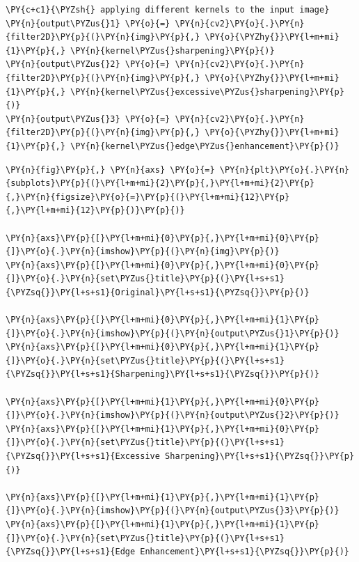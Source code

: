 \begin{tcolorbox}[breakable, size=fbox, boxrule=1pt, pad at break*=1mm,colback=cellbackground, colframe=cellborder]
	\begin{Verbatim}[commandchars=\\\{\}]
\PY{c+c1}{\PYZsh{} applying different kernels to the input image}
\PY{n}{output\PYZus{}1} \PY{o}{=} \PY{n}{cv2}\PY{o}{.}\PY{n}{filter2D}\PY{p}{(}\PY{n}{img}\PY{p}{,} \PY{o}{\PYZhy{}}\PY{l+m+mi}{1}\PY{p}{,} \PY{n}{kernel\PYZus{}sharpening}\PY{p}{)}
\PY{n}{output\PYZus{}2} \PY{o}{=} \PY{n}{cv2}\PY{o}{.}\PY{n}{filter2D}\PY{p}{(}\PY{n}{img}\PY{p}{,} \PY{o}{\PYZhy{}}\PY{l+m+mi}{1}\PY{p}{,} \PY{n}{kernel\PYZus{}excessive\PYZus{}sharpening}\PY{p}{)}
\PY{n}{output\PYZus{}3} \PY{o}{=} \PY{n}{cv2}\PY{o}{.}\PY{n}{filter2D}\PY{p}{(}\PY{n}{img}\PY{p}{,} \PY{o}{\PYZhy{}}\PY{l+m+mi}{1}\PY{p}{,} \PY{n}{kernel\PYZus{}edge\PYZus{}enhancement}\PY{p}{)}
	\end{Verbatim}
\end{tcolorbox}

\begin{tcolorbox}[breakable, size=fbox, boxrule=1pt, pad at break*=1mm,colback=cellbackground, colframe=cellborder]
	\begin{Verbatim}[commandchars=\\\{\}]
\PY{n}{fig}\PY{p}{,} \PY{n}{axs} \PY{o}{=} \PY{n}{plt}\PY{o}{.}\PY{n}{subplots}\PY{p}{(}\PY{l+m+mi}{2}\PY{p}{,}\PY{l+m+mi}{2}\PY{p}{,}\PY{n}{figsize}\PY{o}{=}\PY{p}{(}\PY{l+m+mi}{12}\PY{p}{,}\PY{l+m+mi}{12}\PY{p}{)}\PY{p}{)}

\PY{n}{axs}\PY{p}{[}\PY{l+m+mi}{0}\PY{p}{,}\PY{l+m+mi}{0}\PY{p}{]}\PY{o}{.}\PY{n}{imshow}\PY{p}{(}\PY{n}{img}\PY{p}{)}
\PY{n}{axs}\PY{p}{[}\PY{l+m+mi}{0}\PY{p}{,}\PY{l+m+mi}{0}\PY{p}{]}\PY{o}{.}\PY{n}{set\PYZus{}title}\PY{p}{(}\PY{l+s+s1}{\PYZsq{}}\PY{l+s+s1}{Original}\PY{l+s+s1}{\PYZsq{}}\PY{p}{)}

\PY{n}{axs}\PY{p}{[}\PY{l+m+mi}{0}\PY{p}{,}\PY{l+m+mi}{1}\PY{p}{]}\PY{o}{.}\PY{n}{imshow}\PY{p}{(}\PY{n}{output\PYZus{}1}\PY{p}{)}
\PY{n}{axs}\PY{p}{[}\PY{l+m+mi}{0}\PY{p}{,}\PY{l+m+mi}{1}\PY{p}{]}\PY{o}{.}\PY{n}{set\PYZus{}title}\PY{p}{(}\PY{l+s+s1}{\PYZsq{}}\PY{l+s+s1}{Sharpening}\PY{l+s+s1}{\PYZsq{}}\PY{p}{)}

\PY{n}{axs}\PY{p}{[}\PY{l+m+mi}{1}\PY{p}{,}\PY{l+m+mi}{0}\PY{p}{]}\PY{o}{.}\PY{n}{imshow}\PY{p}{(}\PY{n}{output\PYZus{}2}\PY{p}{)}
\PY{n}{axs}\PY{p}{[}\PY{l+m+mi}{1}\PY{p}{,}\PY{l+m+mi}{0}\PY{p}{]}\PY{o}{.}\PY{n}{set\PYZus{}title}\PY{p}{(}\PY{l+s+s1}{\PYZsq{}}\PY{l+s+s1}{Excessive Sharpening}\PY{l+s+s1}{\PYZsq{}}\PY{p}{)}

\PY{n}{axs}\PY{p}{[}\PY{l+m+mi}{1}\PY{p}{,}\PY{l+m+mi}{1}\PY{p}{]}\PY{o}{.}\PY{n}{imshow}\PY{p}{(}\PY{n}{output\PYZus{}3}\PY{p}{)}
\PY{n}{axs}\PY{p}{[}\PY{l+m+mi}{1}\PY{p}{,}\PY{l+m+mi}{1}\PY{p}{]}\PY{o}{.}\PY{n}{set\PYZus{}title}\PY{p}{(}\PY{l+s+s1}{\PYZsq{}}\PY{l+s+s1}{Edge Enhancement}\PY{l+s+s1}{\PYZsq{}}\PY{p}{)}
	\end{Verbatim}
\end{tcolorbox}

